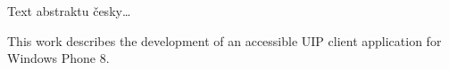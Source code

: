 \startAbstractCz
  Text abstraktu česky\dots
\stopAbstractCz

\startAbstractEn
  This work describes the development of an accessible UIP client application for Windows Phone 8.
\stopAbstractEn

\endinput
